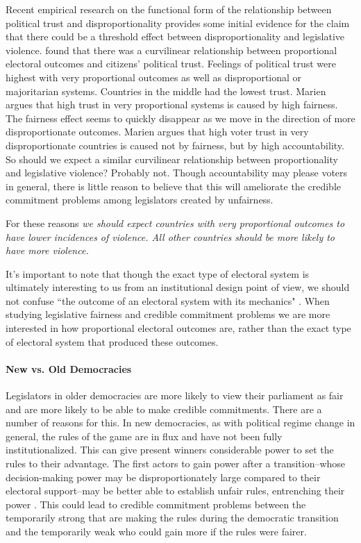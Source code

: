 \documentclass[a4paper]{article}\usepackage[]{graphicx}\usepackage[]{color}
\begin{document}
Recent empirical research on the functional form of the relationship between political trust and disproportionality provides some initial evidence for the claim that there could be a threshold effect between disproportionality and legislative violence. \cite{Marien2011} found that there was a curvilinear relationship between proportional electoral outcomes and citizens' political trust. Feelings of political trust were highest with very proportional outcomes as well as disproportional or majoritarian systems. Countries in the middle had the lowest trust. Marien argues that high trust in very proportional systems is caused by high fairness. The fairness effect seems to quickly disappear as we move in the direction of more disproportionate outcomes. Marien argues that high voter trust in very disproportionate countries is caused not by fairness, but by high accountability. So should we expect a similar curvilinear relationship between proportionality and legislative violence? Probably not. Though accountability may please voters in general, there is little reason to believe that this will ameliorate the credible commitment problems among legislators created by unfairness.

For these reasons \emph{we should expect countries with very proportional outcomes to have lower incidences of violence. All other countries should be more likely to have more violence.}

It's important to note that though the exact type of electoral system is ultimately interesting to us from an institutional design point of view, we should not confuse ``the outcome of an electoral system with its mechanics" \citep[][109]{Golder2005}. When studying legislative fairness and credible commitment problems we are more interested in how proportional electoral outcomes are, rather than the exact type of electoral system that produced these outcomes.

\paragraph{New vs. Old Democracies}

Legislators in older democracies are more likely to view their parliament as fair and are more likely to be able to make credible commitments. There are a number of reasons for this. In new democracies, as with political regime change in general, the rules of the game are in flux and have not been fully institutionalized. This can give present winners considerable power to set the rules to their advantage. The first actors to gain power after a transition--whose decision-making power may be disproportionately large compared to their electoral support--may be better able to establish unfair rules, entrenching their power \cite[108]{Saideman2002}. This could lead to credible commitment problems between the temporarily strong that are making the rules during the democratic transition and the temporarily weak who could gain more if the rules were fairer.
\end{document}
